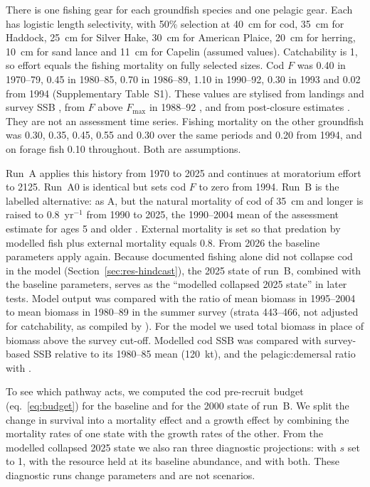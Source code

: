\documentclass[12pt,letterpaper,fleqn]{article}
\newcommand{\yr}{yr$^{-1}$}
\begin{document}
There is one fishing gear for each groundfish species and one pelagic gear. Each has logistic length selectivity, with 50\% selection at 40~cm for cod, 35~cm for Haddock, 25~cm for Silver Hake, 30~cm for American Plaice, 20~cm for herring, 10~cm for sand lance and 11~cm for Capelin (assumed values). Catchability is 1, so effort equals the fishing mortality on fully selected sizes. Cod $F$ was 0.40 in 1970--79, 0.45 in 1980--85, 0.70 in 1986--89, 1.10 in 1990--92, 0.30 in 1993 and 0.02 from 1994 (Supplementary Table~S1). These values are stylised from landings and survey SSB \autocite{fanning2003assessment}, from $F$ above $F_{\max}$ in 1988--92 \autocite{mohn1994assessment}, and from post-closure estimates \autocite{mohn2012laurentian}. They are not an assessment time series. Fishing mortality on the other groundfish was 0.30, 0.35, 0.45, 0.55 and 0.30 over the same periods and 0.20 from 1994, and on forage fish 0.10 throughout. Both are assumptions.

Run~A applies this history from 1970 to 2025 and continues at moratorium effort to 2125. Run~A0 is identical but sets cod $F$ to zero from 1994. Run~B is the labelled alternative: as A, but the natural mortality of cod of 35~cm and longer is raised to 0.8~\yr{} from 1990 to 2025, the 1990--2004 mean of the assessment estimate for ages 5 and older \autocite{mohn2012laurentian}. External mortality is set so that predation by modelled fish plus external mortality equals 0.8. From 2026 the baseline parameters apply again. Because documented fishing alone did not collapse cod in the model (Section~\ref{sec:res-hindcast}), the 2025 state of run~B, combined with the baseline parameters, serves as the ``modelled collapsed 2025 state'' in later tests. Model output was compared with the ratio of mean biomass in 1995--2004 to mean biomass in 1980--89 in the summer survey (strata 443--466, not adjusted for catchability, as compiled by \citeauthor{adekoya2026code} \citeyear{adekoya2026code}). For the model we used total biomass in place of biomass above the survey cut-off. Modelled cod SSB was compared with survey-based SSB \autocite[Table~13]{fanning2003assessment} relative to its 1980--85 mean (120~kt), and the pelagic:demersal ratio with \textcite{bundy2005structure}.

To see which pathway acts, we computed the cod pre-recruit budget (eq.~\ref{eq:budget}) for the baseline and for the 2000 state of run~B. We split the change in survival into a mortality effect and a growth effect by combining the mortality rates of one state with the growth rates of the other. From the modelled collapsed 2025 state we also ran three diagnostic projections: with $s$ set to 1, with the resource held at its baseline abundance, and with both. These diagnostic runs change parameters and are not scenarios.
\end{document}

